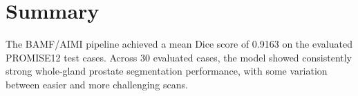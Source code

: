 \documentclass[11pt]{article}
\begin{document}


\section*{Summary}
The BAMF/AIMI pipeline achieved a mean Dice score of 0.9163 on the evaluated PROMISE12 test cases. Across 30 evaluated cases, the model showed consistently strong whole-gland prostate segmentation performance, with some variation between easier and more challenging scans.
\end{document}

